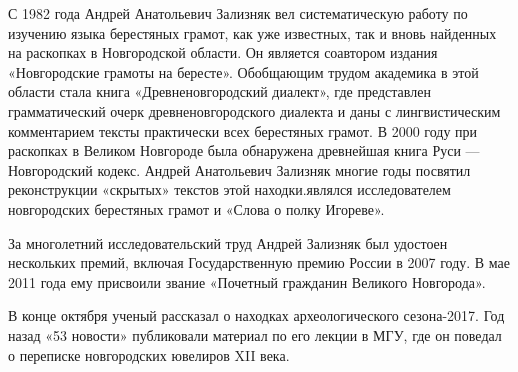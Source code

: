 С 1982 года Андрей Анатольевич Зализняк вел систематическую работу по изучению
языка берестяных грамот, как уже известных, так и вновь найденных на раскопках
в Новгородской области. Он является соавтором издания «Новгородские грамоты на
бересте». Обобщающим трудом академика в этой области стала книга
«Древненовгородский диалект», где представлен грамматический очерк
древненовгородского диалекта и даны с лингвистическим комментарием тексты
практически всех берестяных грамот. В 2000 году при раскопках в Великом
Новгороде была обнаружена древнейшая книга Руси — Новгородский кодекс. Андрей
Анатольевич Зализняк многие годы посвятил реконструкции «скрытых» текстов этой
находки.являлся исследователем новгородских берестяных грамот и «Слова о полку
Игореве».

За многолетний исследовательский труд Андрей Зализняк был удостоен нескольких
премий, включая Государственную премию России в 2007 году.  В мае 2011 года ему
присвоили звание «Почетный гражданин Великого Новгорода».

В конце октября ученый рассказал о находках археологического
сезона-2017.
Год назад «53 новости» публиковали материал по его лекции в МГУ, где он поведал
о переписке новгородских ювелиров XII
века.

